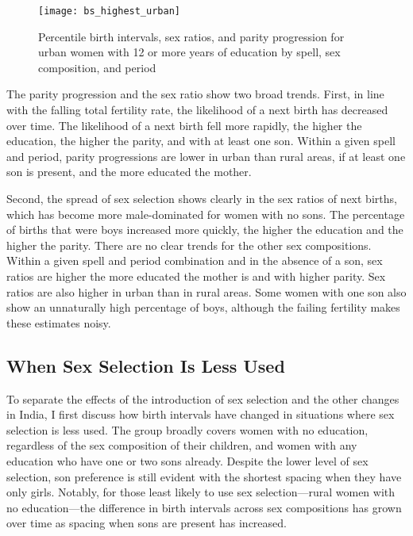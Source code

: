 \documentclass[12pt,letterpaper]{article}
\begin{document}

\begin{figure}
\centering
\texttt{[image: bs\_highest\_urban]}
\caption{Percentile birth intervals, sex ratios, and parity progression  
for urban women with 12 or more years of education by spell, sex composition, and period}
\label{fig:spacing_highest_urban}
\end{figure}


The parity progression and the sex ratio show two broad trends.
First, 
in line with the falling total fertility rate, the likelihood of a next birth 
has decreased over time.
The likelihood of a next birth fell more rapidly, the higher the education, the higher the 
parity, and with at least one son.
Within a given spell and period, parity progressions are lower in urban than rural areas, 
if at least one son is present, and the more educated the mother.


Second, 
the spread of sex selection shows clearly in the sex ratios of next births, which has 
become more male-dominated for women with no sons.
The percentage of births that were boys increased more quickly, the higher the education and the 
higher the parity.
There are no clear trends for the other sex compositions.
Within a given spell and period combination and in the absence of a son, sex ratios are higher 
the more educated the mother is and with higher parity. 
Sex ratios are also higher in urban than in rural areas.
Some women with one son also show an unnaturally high percentage of boys, although the 
failing fertility makes these estimates noisy.


\subsection{When Sex Selection Is Less Used}

To separate the effects of the introduction of sex selection and the other changes in
India, I first discuss how birth intervals have changed in situations where sex selection 
is less used.
The group broadly covers women with no education, regardless of the sex composition of their 
children, and women with any education who have one or two sons already. 
Despite the lower level of sex selection, son preference is still evident with the 
shortest spacing when they have only girls. 
Notably, for those least likely to use sex selection---rural women with no education---the 
difference in birth intervals across sex compositions has grown over time as spacing when 
sons are present has increased.
\end{document}
